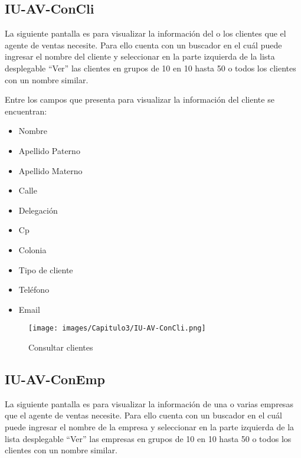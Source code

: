 
\hypertarget{IU:IU-AV-ConCli}{}
\subsection{IU-AV-ConCli}
    La siguiente pantalla es para visualizar la información del o los clientes que el agente de ventas necesite. Para ello cuenta con un buscador en el cuál puede ingresar el nombre del cliente y seleccionar en la parte izquierda de la lista desplegable ``Ver'' las clientes en grupos de 10 en 10 hasta 50 o todos los clientes con un nombre similar.
    
    Entre los campos que presenta para visualizar la información del cliente se encuentran:
    \begin{itemize}
        \item Nombre
        \item Apellido Paterno
        \item Apellido Materno
        \item Calle
        \item Delegación
        \item Cp
        \item Colonia
        \item Tipo de cliente
        \item Teléfono
        \item Email
    \end{itemize}
\begin{figure}[htbp!]
    \centering
    \texttt{[image: images/Capitulo3/IU-AV-ConCli.png]}
    \caption{Consultar clientes}
    \label{fig:my_label}
\end{figure}
\clearpage

\hypertarget{IU:IU-AV-ConEmp}{}
\subsection{IU-AV-ConEmp}
    La siguiente pantalla es para visualizar la información de una o varias empresas que el agente de ventas necesite. Para ello cuenta con un buscador en el cuál puede ingresar el nombre de la empresa y seleccionar en la parte izquierda de la lista desplegable ``Ver'' las empresas en grupos de 10 en 10 hasta 50 o todos los clientes con un nombre similar.
    
